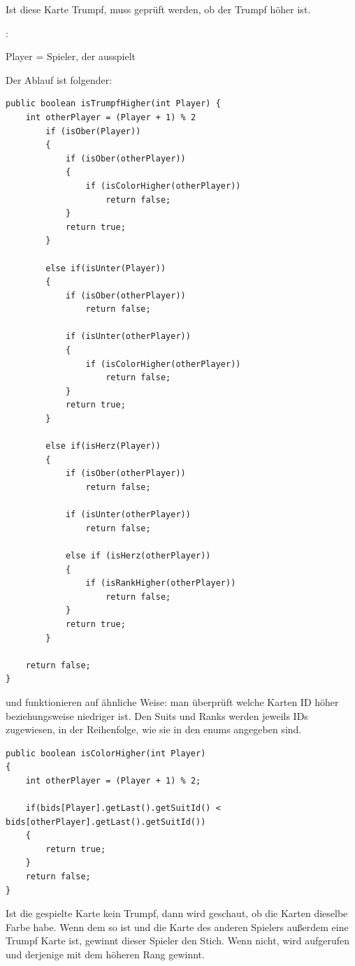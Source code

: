 Ist diese Karte Trumpf, muss geprüft werden, ob der Trumpf höher ist.

: 

Player = Spieler, der ausspielt

Der Ablauf ist folgender:
\begin{lstlisting}[caption={isTrumpfHigher Methode},captionpos=b]
public boolean isTrumpfHigher(int Player) {
    int otherPlayer = (Player + 1) % 2
        if (isOber(Player))
        {
            if (isOber(otherPlayer))
            {
                if (isColorHigher(otherPlayer))
                    return false;
            }
            return true;
        }

        else if(isUnter(Player))
        {
            if (isOber(otherPlayer))
                return false;

            if (isUnter(otherPlayer))
            {
                if (isColorHigher(otherPlayer))
                    return false;
            }
            return true;
        }

        else if(isHerz(Player))
        {
            if (isOber(otherPlayer))
                return false;

            if (isUnter(otherPlayer))
                return false;

            else if (isHerz(otherPlayer))
            {
                if (isRankHigher(otherPlayer))
                    return false;
            }
            return true;
        }

    return false;
}
\end{lstlisting}
 
 und  funktionieren auf ähnliche
Weise: man überprüft welche Karten ID höher beziehungsweise niedriger ist. Den
Suits und Ranks werden jeweils IDs zugewiesen, in der Reihenfolge, wie sie in
den enums angegeben sind.

\begin{lstlisting}[caption={IDs am Beispiel von isColorHigher},captionpos=b]
public boolean isColorHigher(int Player)
{
    int otherPlayer = (Player + 1) % 2;

    if(bids[Player].getLast().getSuitId() < bids[otherPlayer].getLast().getSuitId())
    {
        return true;
    }
    return false;
}
\end{lstlisting}

Ist die gespielte Karte kein Trumpf, dann wird geschaut, ob die Karten dieselbe
Farbe habe. Wenn dem so ist und die Karte des anderen Spielers außerdem eine
Trumpf Karte ist, gewinnt dieser Spieler den Stich. Wenn nicht, wird
 aufgerufen und derjenige mit dem höheren Rang gewinnt.

